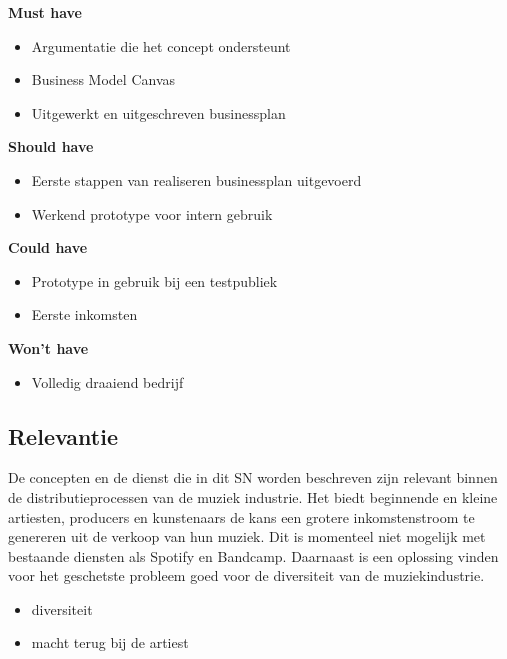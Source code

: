\parbox{\textwidth}{
    \textbf{Must have}
    \begin{itemize}
        \item Argumentatie die het concept ondersteunt
        \item Business Model Canvas
        \item Uitgewerkt en uitgeschreven businessplan
    \end{itemize}
    \textbf{Should have}
    \begin{itemize}
        \item Eerste stappen van realiseren businessplan uitgevoerd
        \item Werkend prototype voor intern gebruik
    \end{itemize}
    \textbf{Could have}
    \begin{itemize}
        \item Prototype in gebruik bij een testpubliek
        \item Eerste inkomsten
    \end{itemize}
    \textbf{Won't have}
    \begin{itemize}
        \item Volledig draaiend bedrijf
    \end{itemize}
}

\subsection{Relevantie}
De concepten en de dienst die in dit SN worden beschreven zijn relevant binnen de distributieprocessen van de muziek industrie. Het biedt beginnende en kleine artiesten, producers en kunstenaars de kans een grotere inkomstenstroom te genereren uit de verkoop van hun muziek. Dit is momenteel niet mogelijk met bestaande diensten als Spotify en Bandcamp. Daarnaast is een oplossing vinden voor het geschetste probleem goed voor de diversiteit van de muziekindustrie.

\begin{itemize}
    \item diversiteit
    \item macht terug bij de artiest
\end{itemize}

